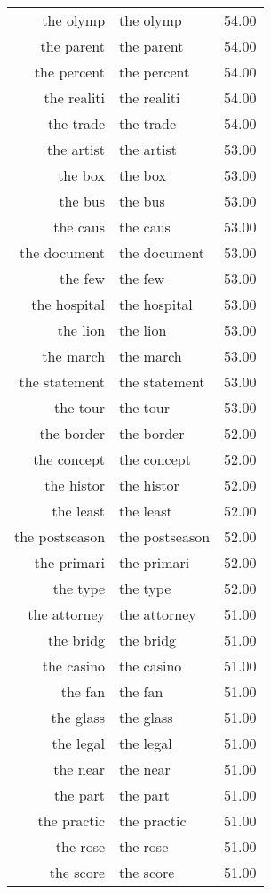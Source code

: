 \begin{table}[ht]
\begin{tabular}{rlr}
  the olymp & the olymp & 54.00 \\ 
  the parent & the parent & 54.00 \\ 
  the percent & the percent & 54.00 \\ 
  the realiti & the realiti & 54.00 \\ 
  the trade & the trade & 54.00 \\ 
  the artist & the artist & 53.00 \\ 
  the box & the box & 53.00 \\ 
  the bus & the bus & 53.00 \\ 
  the caus & the caus & 53.00 \\ 
  the document & the document & 53.00 \\ 
  the few & the few & 53.00 \\ 
  the hospital & the hospital & 53.00 \\ 
  the lion & the lion & 53.00 \\ 
  the march & the march & 53.00 \\ 
  the statement & the statement & 53.00 \\ 
  the tour & the tour & 53.00 \\ 
  the border & the border & 52.00 \\ 
  the concept & the concept & 52.00 \\ 
  the histor & the histor & 52.00 \\ 
  the least & the least & 52.00 \\ 
  the postseason & the postseason & 52.00 \\ 
  the primari & the primari & 52.00 \\ 
  the type & the type & 52.00 \\ 
  the attorney & the attorney & 51.00 \\ 
  the bridg & the bridg & 51.00 \\ 
  the casino & the casino & 51.00 \\ 
  the fan & the fan & 51.00 \\ 
  the glass & the glass & 51.00 \\ 
  the legal & the legal & 51.00 \\ 
  the near & the near & 51.00 \\ 
  the part & the part & 51.00 \\ 
  the practic & the practic & 51.00 \\ 
  the rose & the rose & 51.00 \\ 
  the score & the score & 51.00 \\ 

\end{tabular}
\end{table}
